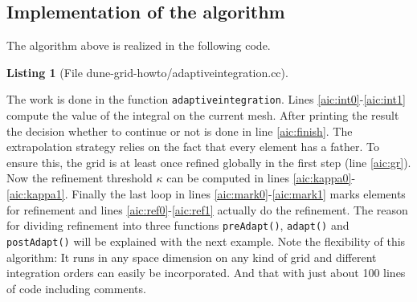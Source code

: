 \documentclass[11pt,a4paper,headinclude,footinclude,DIV16,normalheadings]{scrreprt}
\newtheorem{lst}{Listing}
\begin{document}
\subsection{Implementation of the algorithm}

The algorithm above is realized in the following code.

\begin{lst}[File dune-grid-howto/adaptiveintegration.cc] \mbox{}
\nopagebreak

\end{lst}

The work is done in the function \lstinline!adaptiveintegration!.
Lines \ref{aic:int0}-\ref{aic:int1} compute the value of the integral
on the current mesh. After printing the result the decision whether
to continue or not is done in line \ref{aic:finish}. The extrapolation
strategy relies on the fact that every element has a father. To ensure
this, the grid is at least once refined globally in the first step
(line \ref{aic:gr}). Now the refinement threshold $\kappa$ can be
computed in lines \ref{aic:kappa0}-\ref{aic:kappa1}. Finally the last
loop in lines \ref{aic:mark0}-\ref{aic:mark1} marks elements for
refinement and lines \ref{aic:ref0}-\ref{aic:ref1} actually do the
refinement. The reason for dividing refinement into three functions
\lstinline!preAdapt()!, \lstinline!adapt()! and
\lstinline!postAdapt()! will be explained with the next example. Note
the flexibility of this algorithm: It runs in any space dimension on
any kind of grid and different integration orders can easily be
incorporated. And that with just about 100 lines of code including
comments.
\end{document}
